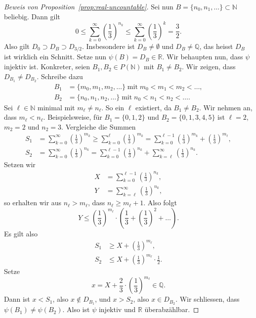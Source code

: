\documentclass[../main.tex]{subfiles}
\begin{document}
\begin{proof}[Beweis von Proposition~\ref{prop:real-uncountable}]
Sei nun $B = \{n_{0}, n_{1}, \dots \} \subset \mathbb N$ beliebig.
Dann gilt
\[
  0
  \leq \sum_{k=0}^{\infty}{\left(\frac{1}{3}\right)}^{n_{k}} 
  \leq \sum_{k=0}^{\infty} {\left(\frac{1}{3}\right)}^{k} 
  = \frac{3}{2}.
\]
Also gilt $D_{0} \supset D_{B} \supset D_{3/2}$.
Insbesondere ist $D_{B} \neq \emptyset$ und $D_{B} \neq \mathbb Q$, das heisst
$D_{B}$ ist wirklich ein Schnitt.
Setze nun
\(\psi(B) = D_{B} \in \mathbb R\).
Wir behaupten nun, dass $\psi$ injektiv ist. Konkreter, seien
$B_{1}, B_{2} \in P(\mathbb N)$ mit $B_{1} \neq B_{2}$.
Wir zeigen, dass $D_{B_{1}} \neq D_{B_{2}}$.
Schreibe dazu
\begin{align*}
  B_{1} &= \{m_{0}, m_{1}, m_{2}, \dots\} \;\text{mit}\; m_{0} < m_{1} < m_{2} < \dots, \\
  B_{2} &= \{n_{0}, n_{1}, n_{2}, \dots\} \;\text{mit}\; n_{0} < n_{1} < n_{2} < \dots.
\end{align*}
Sei $\ell \in \mathbb N$ minimal mit $m_{\ell} \neq n_{\ell}$. So ein $\ell$
existiert, da $B_{1} \neq B_{2}$. Wir nehmen an, dass $m_{\ell} < n_{\ell}$.
Beispielsweise, für $B_{1} = \{0, 1, 2\}$ und $B_{2} = \{0, 1, 3, 4, 5\}$ ist
$\ell = 2$, $m_{2} = 2$ und $n_{2} = 3$.
Vergleiche die Summen
\begin{align*}
  S_{1} &= \sum_{k=0}^{\infty} {\left(\frac{1}{3}\right)}^{m_{k}}
          \geq \sum_{k=0}^{\ell} {\left(\frac{1}{3}\right)}^{m_{k}}
          = \sum_{k=0}^{\ell-1} {\left(\frac{1}{3}\right)}^{m_{k}} + {\left(\frac{1}{3}\right)}^{m_{\ell}}, \\
  S_{2} &= \sum_{k=0}^{\infty}{\left(\frac{1}{3}\right)}^{n_{k}}
          = \sum_{k=0}^{\ell - 1} {\left(\frac{1}{3}\right)}^{n_{k}}
          + \sum_{k= \ell}^{\infty} {\left(\frac{1}{3}\right)}^{n_{k}}.
\end{align*}
Setzen wir
\begin{align*}
  X &= \sum_{k=0}^{\ell - 1}{\left(\frac{1}{3}\right)}^{n_{k}}, \\
  Y &= \sum_{k= \ell}^{\infty} {\left(\frac{1}{3}\right)}^{n_{k}},
\end{align*}
so erhalten wir aus $n_{\ell} > m_{\ell}$, dass $n_{\ell} \geq m_{\ell} + 1$.
Also folgt
\[Y \leq {\left(\frac{1}{3}\right)}^{m_{\ell}} \cdot \left(
    \frac{1}{3} + {\left( \frac{1}{3}\right)}^{2} + \dots
    \right).\]
Es gilt also
\begin{align*}
  S_{1} & \geq X + {\left(\frac{1}{3}\right)}^{m_{\ell}}, \\
  S_{2} & \leq X + {\left(\frac{1}{3}\right)}^{m_{\ell}}\cdot \frac{1}{2}.
\end{align*}
Setze
\[x = X + \frac{2}{3}\cdot {\left(\frac{1}{3}\right)}^{m_{\ell}} \in \mathbb Q.\]
Dann ist $x < S_{1}$, also $x \notin D_{B_{1}}$, und $x > S_{2}$, also
$x \in D_{B_{2}}$. Wir schliessen, dass $\psi(B_{1}) \neq \psi(B_{2})$.
Also ist $\psi$ injektiv und $\mathbb R$ überabzählbar.
\end{proof}
\end{document}

